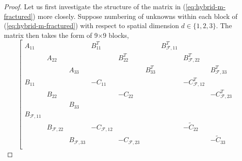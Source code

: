 \def\component{\Omega^c_k}
\begin{proof}

Let us first investigate the structure of the matrix in 
(\ref{eq:hybrid-m-fractured}) more closely. 
Suppose numbering of unknowns within each block of (\ref{eq:hybrid-m-fractured}) 
with respect to spatial dimension $d\in\{1,2,3\}$. The matrix then takes the 
form of 9$\times $9 blocks,
\begin{equation}
\label{eq:crazy_blocks_matrix}
\left[
\begin{matrix}
A_{11}             &                    &                    & B^T_{11}            &                     &            & B^T_{\mathcal{F},11}  &                       &                       \\
                   & A_{22}             &                    &                     & B^T_{22}            &            &                       & B^T_{\mathcal{F},22}  &                       \\
                   &                    & A_{33}             &                     &                     &  B^T_{33}  &                       &                       & B^T_{\mathcal{F},33}  \\
B_{11}             &                    &                    & -C_{11}             &                     &            &                       & -C^T_{\mathcal{F},12} &                       \\
                   & B_{22}             &                    &                     & -C_{22}             &            &                       &                       & -C^T_{\mathcal{F},23} \\
                   &                    & B_{33}             &                     &                     &            &                       &                       &                       \\
B_{\mathcal{F},11} &                    &                    &                     &                     &            &                       &                       &                       \\
                   & B_{\mathcal{F},22} &                    & -C_{\mathcal{F},12} &                     &            &                       & -\widetilde{C}_{22}   &                       \\
                   &                    & B_{\mathcal{F},33} &                     & -C_{\mathcal{F},23} &            &                       &                       & -\widetilde{C}_{33}   \\

\end{matrix}
\end{equation}
\end{proof}
